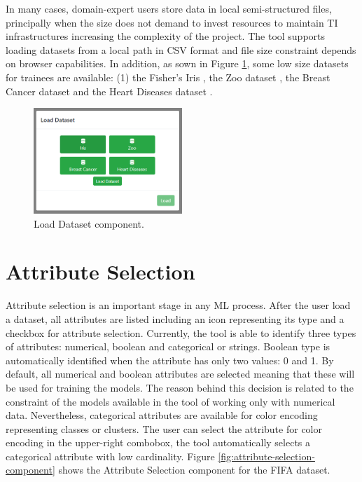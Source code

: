 In many cases, domain-expert users store data in local semi-structured files, principally when the size does not demand to invest resources to maintain TI infrastructures increasing the complexity of the project.
The tool supports loading datasets from a local path in CSV format and file size constraint depends on browser capabilities. In addition, as sown in Figure \ref{fig:load-dataset-component}, some low size datasets for trainees are available: (1) the Fisher's Iris \cite{FisherIris}, the Zoo dataset \cite{*}, the Breast Cancer dataset \cite{*} and the Heart Diseases dataset \cite{*}.

\begin{figure}[ht]
 \centering
 \includegraphics[width=0.5\textwidth]{load_dataset.png}
 \caption{Load Dataset component.}
 \label{fig:load-dataset-component}
\end{figure}

\section{Attribute Selection}
\label{attribute-selection-section}

Attribute selection is an important stage in any ML process. After the user load a dataset, all attributes are listed including an icon representing its type and a checkbox for attribute selection. Currently, the tool is able to identify three types of attributes: numerical, boolean and categorical or strings. Boolean type is automatically identified when the attribute has only two values: 0 and 1. By default, all numerical and boolean attributes are selected meaning that these will be used for training the models. The reason behind this decision is related to the constraint of the models available in the tool of working only with numerical data. Nevertheless, categorical attributes are available for color encoding representing classes or clusters. The user can select the attribute for color encoding in the upper-right combobox, the tool automatically selects a categorical attribute with low cardinality. Figure \ref{fig:attribute-selection-component} shows the Attribute Selection component for the FIFA dataset.


